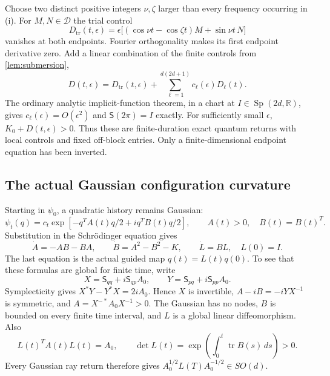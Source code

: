 \documentclass[11pt]{article}
\numberwithin{equation}{section}
\theoremstyle{definition}
\newcommand{\R}{\mathbb R}
\newcommand{\tr}{\operatorname{tr}}
\newcommand{\Sp}{\operatorname{Sp}}
\newcommand{\calD}{\mathcal D}
\begin{document}
Choose two distinct positive integers $\nu,\zeta$ larger than every
frequency occurring in (i). For $M,N\in\calD$ the trial control
\begin{equation}\label{eq:trial}
 D_{\mathrm{tr}}(t,\epsilon)=
 \epsilon\bigl[(\cos\nu t-\cos\zeta t)M+\sin\nu t\,N\bigr]
\end{equation}
vanishes at both endpoints. Fourier orthogonality makes its
first endpoint derivative zero. Add a linear combination of the
finite controls from \cref{lem:submersion},
\begin{equation}\label{eq:corrected}
 D(t,\epsilon)=D_{\mathrm{tr}}(t,\epsilon)
                    +\sum_{\ell=1}^{d(2d+1)}c_\ell(\epsilon)D_\ell(t).
\end{equation}
The ordinary analytic implicit-function theorem, in a chart at
$I\in\Sp(2d,\R)$, gives $c_\ell(\epsilon)=O(\epsilon^2)$ and
$\mathsf S(2\pi)=I$ exactly. For sufficiently small $\epsilon$,
$K_0+D(t,\epsilon)>0$. Thus these are finite-duration exact
quantum returns with local controls and fixed off-block entries.
Only a finite-dimensional endpoint equation has been inverted.

\subsection{The actual Gaussian configuration curvature}

Starting in $\psi_0$, a quadratic history remains Gaussian:
\[
 \psi_t(q)=c_t\exp[-q^TA(t)q/2+iq^TB(t)q/2],
 \qquad A(t)>0,\quad B(t)=B(t)^T .
\]
Substitution in the Schr\"odinger equation gives
\begin{equation}\label{eq:riccati}
 \dot A=-AB-BA,\qquad \dot B=A^2-B^2-K,\qquad
 \dot L=BL,\quad L(0)=I .
\end{equation}
The last equation is the actual guided map $q(t)=L(t)q(0)$.
To see that these formulas are global for finite time, write
\[
 X=\mathsf S_{qq}+i\mathsf S_{qp}A_0,\qquad
 Y=\mathsf S_{pq}+i\mathsf S_{pp}A_0 .
\]
Symplecticity gives $X^*Y-Y^*X=2iA_0$. Hence $X$ is invertible,
$A-iB=-iYX^{-1}$ is symmetric, and
$A=X^{-*}A_0X^{-1}>0$. The Gaussian has no nodes, $B$ is
bounded on every finite time interval, and $L$ is a global linear
diffeomorphism. Also
\begin{equation}\label{eq:covariance}
 L(t)^TA(t)L(t)=A_0,\qquad
 \det L(t)=\exp\left(\int_0^t\tr B(s)\,ds\right)>0 .
\end{equation}
Every Gaussian ray return therefore gives
$A_0^{1/2}L(T)A_0^{-1/2}\in SO(d)$.
\end{document}
